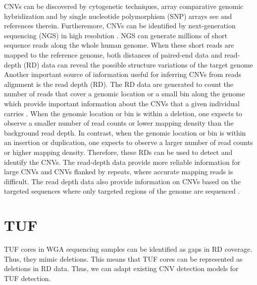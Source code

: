 CNVs can be discovered by cytogenetic techniques, array comparative genomic
hybridization and by single nucleotide polymorphism (SNP) arrays see \citep{cai2012} and
references therein. Furtheremore, CNVs can be identified by next-generation sequencing (NGS) 
in high resolution \cite{cai2012}. NGS
can generate millions of short sequence reads along the whole human genome. When these
short reads are mapped to the reference genome, both distances of paired-end data 
and read-depth (RD) data can reveal the possible structure variations of the target genome \cite{cai2012}
Another important source of information useful for inferring CNVs from reads alignment is
the read depth (RD). The RD data are generated to count the number of reads that cover a
genomic location or a small bin along the genome which provide important information
about the CNVs that a given individual carries \cite{cai2012}. 
When the genomic location or bin is within a deletion, one expects to observe a
smaller number of read counts or lower mapping density than the background read depth. In
contrast, when the genomic location or bin is within an insertion or duplication, one expects
to observe a larger number of read counts or higher mapping density. Therefore, these RDs
can be used to detect and identify the CNVs. The read-depth data provide more reliable
information for large CNVs and CNVs flanked by repeats, where accurate mapping reads is
difficult. The read depth data also provide information on CNVs based on the targeted
sequences where only targeted regions of the genome are sequenced \cite{cai2012}.


\section{TUF}
\label{tuf}

TUF cores in WGA sequencing samples can be identified as gaps in RD coverage. Thus, they
mimic deletions. This means that TUF cores can be represented as deletions in RD data. Thus, we can adapt
existing CNV detection models for TUF detection.


























